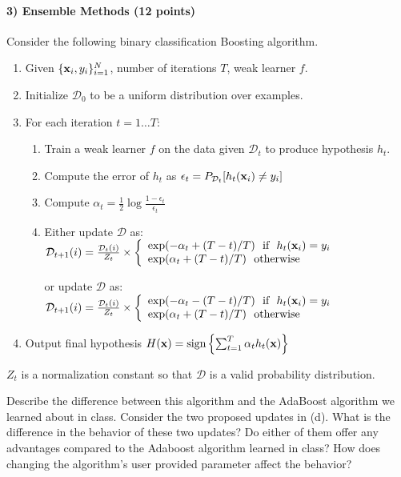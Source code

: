 \documentclass[11pt]{article}
\newcommand{\vx}{{\bf x}}
\newcommand{\vxi}{{\bf x}_i}
\newcommand{\yi}{y_i}
\newcommand{\D}{\mathcal{D}}
\begin{document}
	\paragraph{3) Ensemble Methods (12 points)}
	
	Consider the following binary classification Boosting algorithm.
	\begin{enumerate}
		\item Given $\{\vxi, \yi\}_{i=1}^N$, number of iterations $T$, weak learner $f$.
		\item Initialize $\D_0$ to be a uniform distribution over examples.
		\item For each iteration $t = 1 \ldots T$:
		\begin{enumerate}
			\item Train a weak learner $f$ on the data given $\D_t$ to produce hypothesis $h_t$.
			\item Compute the error of $h_t$ as $\epsilon_t = P_{\D_t} [h_t(\vxi) \ne \yi]$
			\item Compute $\alpha_t = \frac{1}{2} \log \frac{1-\epsilon_t}{\epsilon_t}$
			\item Either update $\D$ as:\\
			$\D_{t+1}(i) = \frac{\D_t(i)}{Z_t} \times \left\{
			\begin{array}{lr}
			\exp(-\alpha_t + (T- t) / T) ~~  \textrm{if} ~~ h_t(\vxi) = \yi  \\
			\exp(\alpha_t + (T-t) / T) ~~ \textrm{otherwise}
			\end{array}
			\right.$
			
			or update $\D$ as:\\
			$\D_{t+1}(i) = \frac{\D_t(i)}{Z_t} \times \left\{
			\begin{array}{lr}
			\exp(-\alpha_t - (T- t) / T) ~~  \textrm{if} ~~ h_t(\vxi) = \yi  \\
			\exp(\alpha_t + (T-t) / T) ~~ \textrm{otherwise}
			\end{array}
			\right.$
		\end{enumerate}
		\item Output final hypothesis $H(\vx)=\textrm{sign} \left\{ \sum_{t=1}^T \alpha_t h_t(\vx) \right\}$
	\end{enumerate}
	
	$Z_t$ is a normalization constant so that $\D$ is a valid probability distribution.
	
	Describe the difference between this algorithm and the AdaBoost algorithm we learned about in class. Consider the two proposed updates in (d). What is the difference in the behavior of these two updates? Do either of them offer any advantages compared to the Adaboost algorithm learned in class? How does changing the algorithm's user provided parameter affect the behavior?
	
\end{document}
